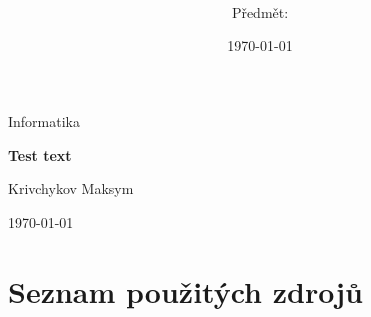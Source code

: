 \documentclass[a4paper,12pt]{article}
\title{\textbf{\nazevPrace}}
\author{\autorPrace \\ \small Předmět: \predmetPrace}
\date{\today}
\newcommand{\nazevPrace}{Test text}
\newcommand{\autorPrace}{Krivchykov Maksym}
\newcommand{\predmetPrace}{Informatika}
\begin{document}
\begin{titlepage}
  \centering
  \vspace*{2cm}
  {\Large \predmetPrace \par}
  \vspace{2.5cm}
  {\Huge \bfseries \nazevPrace \par}
  \vspace{1.5cm}
  {\Large \autorPrace \par}
  \vfill
  {\large \today \par}
\end{titlepage}


\tableofcontents
\newpage





\newpage
\section*{Seznam použitých zdrojů}

\end{document}
